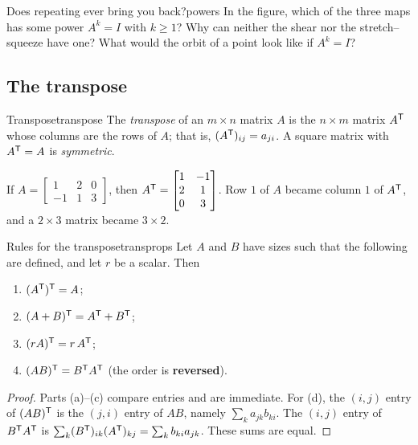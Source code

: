 \documentclass[11pt]{article}
\begin{document}
\begin{think}{Does repeating ever bring you back?}{powers}
In the figure, which of the three maps has some power $A^k=I$ with $k\ge1$? Why can neither the shear nor the stretch--squeeze have one? What would the orbit of a point look like if $A^k=I$?
\end{think}

\subsection*{The transpose}

\begin{defn}{Transpose}{transpose}
The \emph{transpose} of an $m\times n$ matrix $A$ is the $n\times m$ matrix $A^{\mathsf T}$ whose columns are the rows of $A$; that is, $(A^{\mathsf T})_{ij}=a_{ji}$. A square matrix with $A^{\mathsf T}=A$ is \emph{symmetric}.
\end{defn}

If $A=\begin{bmatrix}1&2&0\\-1&1&3\end{bmatrix}$, then $A^{\mathsf T}=\begin{bmatrix}1&-1\\2&1\\0&3\end{bmatrix}$. Row $1$ of $A$ became column $1$ of $A^{\mathsf T}$, and a $2\times3$ matrix became $3\times2$.

\begin{thm}{Rules for the transpose}{transprops}
Let $A$ and $B$ have sizes such that the following are defined, and let $r$ be a scalar. Then
\begin{enumerate}[label=(\alph*),itemsep=1pt]
  \item $(A^{\mathsf T})^{\mathsf T}=A$;
  \item $(A+B)^{\mathsf T}=A^{\mathsf T}+B^{\mathsf T}$;
  \item $(rA)^{\mathsf T}=r\,A^{\mathsf T}$;
  \item $(AB)^{\mathsf T}=B^{\mathsf T} A^{\mathsf T}$ \quad (the order is \textbf{reversed}).
\end{enumerate}
\end{thm}

\begin{proof}
Parts (a)--(c) compare entries and are immediate. For (d), the $(i,j)$ entry of $(AB)^{\mathsf T}$ is the $(j,i)$ entry of $AB$, namely $\sum_k a_{jk}b_{ki}$. The $(i,j)$ entry of $B^{\mathsf T} A^{\mathsf T}$ is $\sum_k (B^{\mathsf T})_{ik}(A^{\mathsf T})_{kj}=\sum_k b_{ki}a_{jk}$. These sums are equal.
\end{proof}
\end{document}
